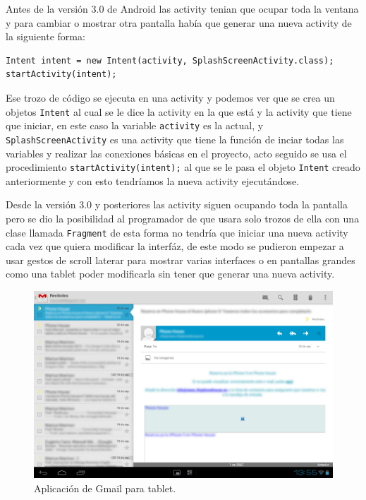 \begin{itemize}
\begin{center}
\begin{tabular}{|l | c | r|}
\end{tabular}
\end{center}

Antes de la versión 3.0 de Android las activity tenian que ocupar toda la ventana y para cambiar o mostrar otra pantalla había que generar una nueva activity de la siguiente forma:

\begin{lstlisting}[style=Java]
Intent intent = new Intent(activity, SplashScreenActivity.class);
startActivity(intent);
\end{lstlisting}

Ese trozo de código se ejecuta en una activity y podemos ver que se crea un objetos \lstinline{Intent} al cual se le dice la activity en la que está y la activity que tiene que iniciar, en este caso la variable \lstinline{activity} es la actual, y \lstinline{SplashScreenActivity} es una activity que tiene la función de inciar todas las variables y realizar las conexiones básicas en el proyecto, acto seguido se usa el procedimiento \lstinline{startActivity(intent);} al que se le pasa el objeto \lstinline{Intent} creado anteriormente y con esto tendríamos la nueva activity ejecutándose.

Desde la versión 3.0 y posteriores las activity siguen ocupando toda la pantalla pero se dio la posibilidad al programador de que usara solo trozos de ella con una clase llamada \lstinline{Fragment} de esta forma no tendría que iniciar una nueva activity cada vez que quiera modificar la interfáz, de este modo se pudieron empezar a usar gestos de scroll laterar para mostrar varias interfaces o en pantallas grandes como una tablet poder modificarla sin tener que generar una nueva activity. 
\begin{figure}
  \centering
    \includegraphics[scale=0.3]{./Android/imagenes/gmailTablet.png}
  \caption{Aplicación de Gmail para tablet.}
  \label{fig:gmailTablet}
\end{figure}


\end{itemize}
